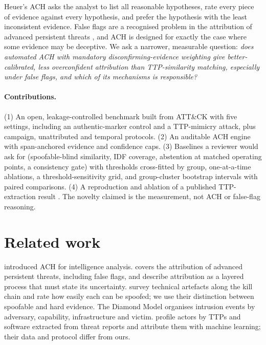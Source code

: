 \documentclass[11pt]{article}
\begin{document}
Heuer's ACH \citep{heuer1999} asks the analyst to list all reasonable
hypotheses, rate every piece of evidence against every hypothesis, and prefer
the hypothesis with the least inconsistent evidence. False flags are a
recognised problem in the attribution of advanced persistent threats
\citep[Ch.~10]{steffens2020}, and ACH is designed for exactly the case where
some evidence may be deceptive. We ask a narrower, measurable question:
\emph{does automated ACH with mandatory disconfirming-evidence weighting give
better-calibrated, less overconfident attribution than TTP-similarity
matching, especially under false flags, and which of its mechanisms is
responsible?}

\paragraph{Contributions.} (1) An open, leakage-controlled benchmark built
from ATT\&CK \citep{strom2018} with five settings, including an authentic-marker
control and a TTP-mimicry attack, plus campaign, unattributed and temporal
protocols. (2) An auditable ACH engine with span-anchored evidence and
confidence caps. (3) Baselines a reviewer would ask for (spoofable-blind
similarity, IDF coverage, abstention at matched operating points, a
consistency gate) with thresholds cross-fitted by group, one-at-a-time
ablations, a threshold-sensitivity grid, and group-cluster bootstrap
intervals with paired comparisons. (4) A reproduction and ablation of a
published TTP-extraction result \citep{legoy2020}. The novelty claimed is the
measurement, not ACH or false-flag reasoning.

\section{Related work}
\citet{heuer1999} introduced ACH for intelligence analysis. \citet{steffens2020}
covers the attribution of advanced persistent threats, including false flags,
and \citet{rid2015} describe attribution as a layered process that must state
its uncertainty. \citet{skopik2020} survey technical artefacts along the kill
chain and rate how easily each can be spoofed; we use their distinction
between spoofable and hard evidence. The Diamond Model \citep{caltagirone2013}
organises intrusion events by adversary, capability, infrastructure and
victim. \citet{noor2019} profile actors by TTPs and software extracted from
threat reports and attribute them with machine learning; their data and
protocol differ from ours.
\end{document}

